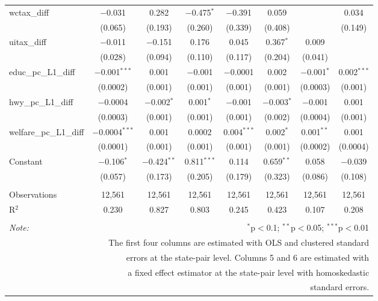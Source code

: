\begin{table}[!htbp]
\begin{tabular}{@{\extracolsep{5pt}}lccccccc}
  wctax\_diff & $-$0.031 & 0.282 & $-$0.475$^{*}$ & $-$0.391 & 0.059 &  & 0.034 \\ 
  & (0.065) & (0.193) & (0.260) & (0.339) & (0.408) &  & (0.149) \\ 
  uitax\_diff & $-$0.011 & $-$0.151 & 0.176 & 0.045 & 0.367$^{*}$ & 0.009 &  \\ 
  & (0.028) & (0.094) & (0.110) & (0.117) & (0.204) & (0.041) &  \\ 
  educ\_pc\_L1\_diff & $-$0.001$^{***}$ & 0.001 & $-$0.001 & $-$0.0001 & 0.002 & $-$0.001$^{*}$ & 0.002$^{***}$ \\ 
  & (0.0002) & (0.001) & (0.001) & (0.001) & (0.001) & (0.0003) & (0.001) \\ 
  hwy\_pc\_L1\_diff & $-$0.0004 & $-$0.002$^{*}$ & 0.001$^{*}$ & $-$0.001 & $-$0.003$^{*}$ & $-$0.001 & 0.001 \\ 
  & (0.0003) & (0.001) & (0.001) & (0.001) & (0.002) & (0.0004) & (0.001) \\ 
  welfare\_pc\_L1\_diff & $-$0.0004$^{***}$ & 0.001 & 0.0002 & 0.004$^{***}$ & 0.002$^{*}$ & 0.001$^{**}$ & 0.001 \\ 
  & (0.0001) & (0.001) & (0.001) & (0.001) & (0.001) & (0.0002) & (0.0004) \\ 
  Constant & $-$0.106$^{*}$ & $-$0.424$^{**}$ & 0.811$^{***}$ & 0.114 & 0.659$^{**}$ & 0.058 & $-$0.039 \\ 
  & (0.057) & (0.173) & (0.205) & (0.179) & (0.323) & (0.086) & (0.108) \\ 
 \hline \\[-1.8ex] 
Observations & 12,561 & 12,561 & 12,561 & 12,561 & 12,561 & 12,561 & 12,561 \\ 
R$^{2}$ & 0.230 & 0.827 & 0.803 & 0.245 & 0.423 & 0.107 & 0.208 \\ 
\hline 
\hline \\[-1.8ex] 
\textit{Note:}  & \multicolumn{7}{r}{$^{*}$p$<$0.1; $^{**}$p$<$0.05; $^{***}$p$<$0.01} \\ 
 & \multicolumn{7}{r}{The first four columns are estimated with OLS and clustered standard} \\ 
 & \multicolumn{7}{r}{ errors at the state-pair level. Columns 5 and 6 are estimated with} \\ 
 & \multicolumn{7}{r}{a fixed effect estimator at the state-pair level with homoskedastic} \\ 
 & \multicolumn{7}{r}{standard errors.} \\ 
\end{tabular} 
\end{table} 
